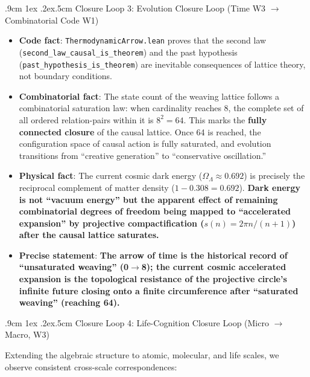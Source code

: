 \documentclass[aps,prd,twocolumn,nofootinbib,floatfix]{revtex4-2}
\makeatletter
\def\subsection{%
  \@startsection{subsection}{2}{\z@}
    {.9cm \@plus1ex \@minus .2ex}{.5cm}
    {\normalfont\normalsize\bfseries\centering}%
}
\makeatother
\begin{document}
\subsection{Closure Loop 3: Evolution Closure Loop (Time W3 $\to$ Combinatorial Code W1)}

\begin{itemize}
    \item \textbf{Code fact}: \texttt{ThermodynamicArrow.lean} proves that the second law (\texttt{second\_law\_causal\_is\_theorem}) and the past hypothesis (\texttt{past\_hypothesis\_is\_theorem}) are inevitable consequences of lattice theory, not boundary conditions.
    \item \textbf{Combinatorial fact}: The state count of the weaving lattice follows a combinatorial saturation law: when cardinality reaches 8, the complete set of all ordered relation-pairs within it is $8^2 = 64$. This marks the \textbf{fully connected closure} of the causal lattice. Once 64 is reached, the configuration space of causal action is fully saturated, and evolution transitions from ``creative generation'' to ``conservative oscillation.''
    \item \textbf{Physical fact}: The current cosmic dark energy ($\Omega_\Lambda \approx 0.692$) is precisely the reciprocal complement of matter density ($1 - 0.308 = 0.692$). \textbf{Dark energy is not ``vacuum energy'' but the apparent effect of remaining combinatorial degrees of freedom being mapped to ``accelerated expansion'' by projective compactification ($s(n) = 2\pi n/(n+1)$) after the causal lattice saturates.}
    \item \textbf{Precise statement}: \textbf{The arrow of time is the historical record of ``unsaturated weaving'' (0$\to$8); the current cosmic accelerated expansion is the topological resistance of the projective circle's infinite future closing onto a finite circumference after ``saturated weaving'' (reaching 64).}
\end{itemize}

\subsection{Closure Loop 4: Life-Cognition Closure Loop (Micro $\to$ Macro, W3)}

Extending the algebraic structure to atomic, molecular, and life scales, we observe consistent cross-scale correspondences:
\end{document}
